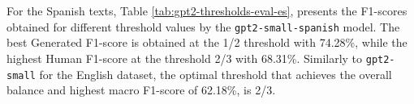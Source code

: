 \documentclass[a4paper,11pt,twocolumn,twoside]{article}
\begin{document}
For the Spanish texts, Table \ref{tab:gpt2-thresholds-eval-es}, presents the F1-scores obtained for different threshold values by the \texttt{gpt2-small-spanish} model. The best Generated F1-score is obtained at the 1/2 threshold with 74.28\%, while the highest Human F1-score at the threshold 2/3 with 68.31\%.
Similarly to \texttt{gpt2-small} for the English dataset, the optimal threshold that achieves the overall balance and highest macro F1-score of 62.18\%, is 2/3.
\begin{table}[!h]
    \centering
    \caption{GPT-2 Small Spanish F1-scores with different threshold values (subtask 1 for Spanish).}
    \label{tab:gpt2-thresholds-eval-es}
\end{table}
\end{document}
